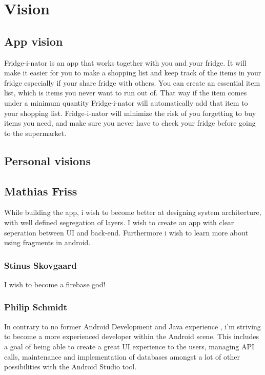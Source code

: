 \graphicspath{{Chapters/Vision/}}

\section{Vision}

\subsection{App vision}
Fridge-i-nator is an app that works together with you and your fridge. It will make it easier for you to make a shopping
list and keep track of the items in your fridge especially if your share fridge with others. You can create an essential
item list, which is items you never want to run out of. That way if the item comes under a minimum quantity Fridge-i-nator
will automatically add that item to your shopping list. 
Fridge-i-nator will minimize the risk of you forgetting to buy items you need, and make sure you never have to check your
fridge before going to the supermarket.

\subsection{Personal visions}

\subsection{Mathias Friss}
While building the app, i wish to become better at designing system architecture, with well defined segregation of layers. I wish to create an app with clear seperation between UI and back-end.
Furthermore i wish to learn more about using fragments in android.

\subsubsection{Stinus Skovgaard}
I wish to become a firebase god!	

\subsubsection{Philip Schmidt}
In contrary to no former Android Development and Java experience , i'm striving to become a more experienced developer within the Android scene.
This includes a goal of being able to create a great UI experience to the users, managing API calls, maintenance and implementation of databases amongst a lot of other possibilities with the Android Studio tool.

